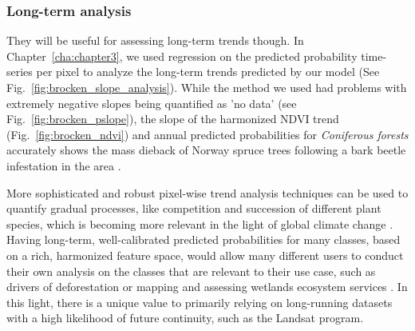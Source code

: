         \subsubsection{Long-term analysis}
        They will be useful for assessing long-term trends though. In Chapter\@~\ref{cha:chapter3}, we used regression on the predicted probability time-series per pixel to analyze the long-term trends predicted by our model (See Fig.\@~\ref{fig:brocken_slope_analysis}). While the method we used had problems with extremely negative slopes being quantified as 'no data' (see Fig.\@~\ref{fig:brocken_pslope}), the slope of the harmonized NDVI trend (Fig.\@~\ref{fig:brocken_ndvi}) and annual predicted probabilities for \textit{Coniferous forests} accurately shows the mass dieback of Norway spruce trees following a bark beetle infestation in the area \citep{meyer2017matter}.

        More sophisticated and robust pixel-wise trend analysis techniques can be used to quantify gradual processes, like competition and succession of different plant species, which is becoming more relevant in the light of global climate change \citep{bonannella2023biomes}. Having long-term, well-calibrated predicted probabilities for many classes, based on a rich, harmonized feature space, would allow many different users to conduct their own analysis on the classes that are relevant to their use case, such as drivers of deforestation \citep{masolele2024mapping} or mapping and assessing wetlands ecosystem services \citep{fitoka2020water}. In this light, there is a unique value to primarily relying on long-running datasets with a high likelihood of future continuity, such as the Landsat program.
        
